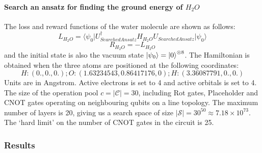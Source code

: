 \documentclass[a4paper,onecolumn,11pt]{quantumarticle}
\begin{document}
\paragraph{Search an ansatz for finding the ground energy of $H_2 O$} The loss and reward functions of the water molecule are shown as follows:
\begin{equation}
    L_{H_2 O} =\langle \psi_0 \vert U_{SearchedAnsatz}^{\dagger} H_{H_2 O} U_{SearchedAnsatz} \vert \psi_0\rangle
\end{equation}
\begin{equation}
    R_{H_2 O} = -L_{H_2 O}
\end{equation}
and the initial state is also the vacuum state $\ket{\psi_0} = \ket{0}^{\otimes 8}$. The Hamiltonian is obtained when the three atoms are positioned at the following coordinates:
\begin{equation}
    H:(0.,0.,0.); 
    O:(1.63234543, 0.86417176, 0);
    H:(3.36087791, 0.,0.)
\end{equation}
Units are in Angstrom.
Active electrons is set to 4 and active orbitals is set to 4. The size of the operation pool $c = \vert \mathcal{C} \vert = 30$, including Rot gates, Placeholder and CNOT gates operating on neighbouring qubits on a line topology. The maximum number of layers is 20, giving us a search space of size $\vert \mathcal{S} \vert = 30^{50} \approx 7.18\times 10^{73}$. The `hard limit' on the number of CNOT gates in the circuit is 25.
\subsubsection{Results}
\end{document}
